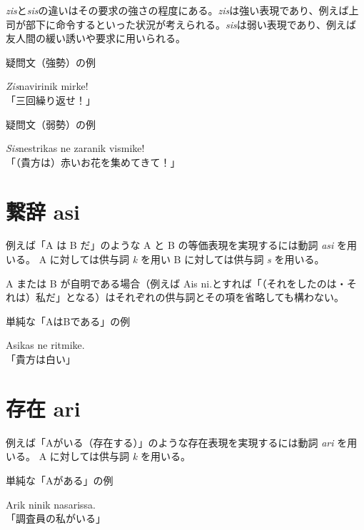 \emph{zis}と\emph{sis}の違いはその要求の強さの程度にある。\emph{zis}は強い表現であり、例えば上司が部下に命令するといった状況が考えられる。\emph{sis}は弱い表現であり、例えば友人間の緩い誘いや要求に用いられる。

\begin{itembox}[l]{疑問文（強勢）の例}
    \begin{pindent}
        \noindent
        \emph{Zis}navirinik mirke! \\
        「三回繰り返せ！」
    \end{pindent}
\end{itembox}

\begin{itembox}[l]{疑問文（弱勢）の例}
    \begin{pindent}
        \noindent
        \emph{Sis}nestrikas ne zaranik vismike! \\
        「（貴方は）赤いお花を集めてきて！」
    \end{pindent}
\end{itembox}

\section{繋辞 asi}

例えば「A は B だ」のような A と B の等価表現を実現するには動詞 \emph{asi} を用いる。
A に対しては供与詞 \emph{k} を用い B に対しては供与詞 \emph{s} を用いる。

A または B が自明である場合（例えば Ais ni.とすれば「（それをしたのは・それは）私だ」となる）はそれぞれの供与詞とその項を省略しても構わない。

\begin{itembox}[l]{単純な「AはBである」の例}
    \begin{pindent}
        \noindent
        Asikas ne ritmike. \\
        「貴方は白い」
    \end{pindent}
\end{itembox}

\section{存在 ari}

例えば「Aがいる（存在する）」のような存在表現を実現するには動詞 \emph{ari} を用いる。
A に対しては供与詞 \emph{k} を用いる。

\begin{itembox}[l]{単純な「Aがある」の例}
    \begin{pindent}
        \noindent
        Arik ninik nasarissa. \\
        「調査員の私がいる」
    \end{pindent}
\end{itembox}
